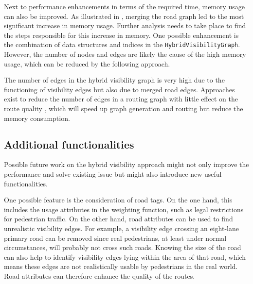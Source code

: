 		Next to performance enhancements in terms of the required time, memory usage can also be improved.
		As illustrated in , merging the road graph led to the most significant increase in memory usage.
		Further analysis needs to take place to find the steps responsible for this increase in memory.
		One possible enhancement is the combination of data structures and indices in the \texttt{HybridVisibilityGraph}.
		However, the number of nodes and edges are likely the cause of the high memory usage, which can be reduced by the following approach.
		
		The number of edges in the hybrid visibility graph is very high due to the functioning of visibility edges but also due to merged road edges.
		Approaches exist to reduce the number of edges in a routing graph with little effect on the route quality \cite{aumann-reducing-routing-graph}, which will speed up graph generation and routing but reduce the memory consumption.

	\subsection{Additional functionalities}
		
		Possible future work on the hybrid visibility approach might not only improve the performance and solve existing issue but might also introduce new useful functionalities.
		
		One possible feature is the consideration of road tags.
		On the one hand, this includes the usage attributes in the weighting function, such as legal restrictions for pedestrian traffic.
		On the other hand, road attributes can be used to find unrealistic visibility edges.
		For example, a visibility edge crossing an eight-lane primary road can be removed since real pedestrians, at least under normal circumstances, will probably not cross such roads.
		Knowing the size of the road can also help to identify visibility edges lying within the area of that road, which means these edges are not realistically usable by pedestrians in the real world.
		Road attributes can therefore enhance the quality of the routes.
		
